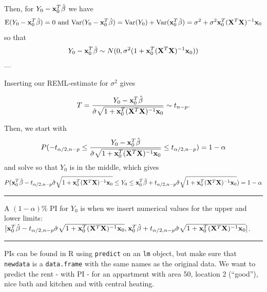 \documentclass[
]{article}
\begin{document}
Then, for \(Y_0-{\bf x}_0^T \hat{\beta}\) we have
\[\text{E}(Y_0-{\bf x}_0^T \hat{\beta})=0 \text{ and } \text{Var}(Y_0-{\bf x}_0^T \hat{\beta})=\text{Var}(Y_0)+\text{Var}({\bf x}_0^T \hat{\beta})=\sigma^2+\sigma^2{\bf x}_0^T({\bf X}^T{\bf X})^{-1}{\bf x}_0\]
so that
\[Y_0-{\bf x}_0^T \hat{\beta}\sim N(0,\sigma^2 (1+{\bf x}_0^T({\bf X}^T{\bf X})^{-1}{\bf x}_0)) \]
---

Inserting our REML-estimate for \(\sigma^2\) gives

\[T=\frac{Y_0-{\bf x}_0^T \hat{\beta}}{\hat{\sigma}\sqrt{1+{\bf x}_0^T({\bf X}^T{\bf X})^{-1}{\bf x}_0}}\sim t_{n-p}.\]

Then, we start with
\[ P(-t_{\alpha/2,n-p}\le \frac{Y_0-{\bf x}_0^T \hat{\beta}}{\hat{\sigma}\sqrt{1+{\bf x}_0^T({\bf X}^T{\bf X})^{-1}{\bf x}_0}} \le t_{\alpha/2,n-p})=1-\alpha\]
and solve so that \(Y_0\) is in the middle, which gives
\[P({\bf x}_0^T \hat{\beta}-t_{\alpha/2,n-p}\hat{\sigma}\sqrt{1+{\bf x}_0^T({\bf X}^T{\bf X})^{-1}{\bf x}_0} \le Y_0 \le {\bf x}_0^T \hat{\beta}+t_{\alpha/2,n-p}\hat{\sigma}\sqrt{1+{\bf x}_0^T({\bf X}^T{\bf X})^{-1}{\bf x}_0})=1-\alpha\]

\begin{center}\rule{0.5\linewidth}{0.5pt}\end{center}

A \((1-\alpha)\)\% PI for \(Y_0\) is when we insert numerical values for
the upper and lower limits:
\([{\bf x}_0^T \hat{\beta}-t_{\alpha/2,n-p}\hat{\sigma}\sqrt{1+{\bf x}_0^T({\bf X}^T{\bf X})^{-1}{\bf x}_0}, {\bf x}_0^T \hat{\beta}+t_{\alpha/2,n-p}\hat{\sigma}\sqrt{1+{\bf x}_0^T({\bf X}^T{\bf X})^{-1}{\bf x}_0}]\).

\begin{center}\rule{0.5\linewidth}{0.5pt}\end{center}

PIs can be found in R using \texttt{predict} on an \texttt{lm} object,
but make sure that \texttt{newdata} is a \texttt{data.frame} with the
same names as the original data. We want to predict the rent - with PI -
for an appartment with area 50, location 2 (``good''), nice bath and
kitchen and with central heating.
\end{document}
